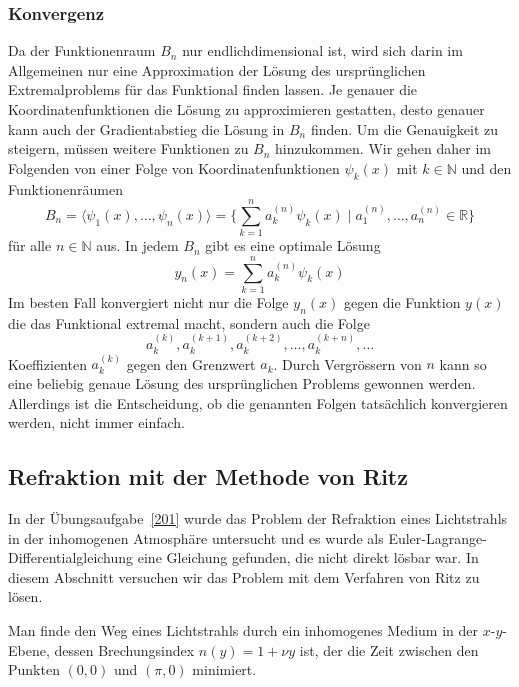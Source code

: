 %
%
\subsubsection{Konvergenz}
Da der Funktionenraum $B_n$ nur endlichdimensional ist, wird sich darin
im Allgemeinen nur eine Approximation der Lösung des ursprünglichen
Extremalproblems für das Funktional finden lassen.
Je genauer die Koordinatenfunktionen die Lösung zu approximieren gestatten,
desto genauer kann auch der Gradientabstieg die Lösung in $B_n$ finden.
Um die Genauigkeit zu steigern, müssen weitere Funktionen zu $B_n$ hinzukommen.
Wir gehen daher im Folgenden von einer Folge von Koordinatenfunktionen
$\psi_k(x)$ mit $k\in \mathbb{N}$ und den Funktionenräumen
\[
B_n
=
\langle \psi_1(x),\dots,\psi_n(x)\rangle
=
\biggl\{
\sum_{k=1}^n a_k^{(n)} \psi_k(x)
\;
\bigg|
\;
a_1^{(n)},\dots,a_n^{(n)}\in\mathbb{R}
\biggr\}
\]
für alle $n\in\mathbb{N}$ aus.
In jedem $B_n$ gibt es eine optimale Lösung
\[
y_n(x)
=
\sum_{k=1}^n a_k^{(n)} \psi_k(x)
\]
Im besten Fall konvergiert nicht nur die Folge $y_n(x)$ gegen die
Funktion $y(x)$ die das Funktional extremal macht, sondern auch
die Folge
\[
a_k^{(k)},
a_k^{(k+1)},
a_k^{(k+2)},
\dots,
a_k^{(k+n)},
\dots
\]
Koeffizienten $a_k^{(k)}$ gegen den Grenzwert $a_k$.
Durch Vergrössern von $n$ kann so eine beliebig genaue Lösung des
ursprünglichen Problems gewonnen werden.
Allerdings ist die Entscheidung, ob die genannten Folgen tatsächlich
konvergieren werden, nicht immer einfach.

%
%
\subsection{Refraktion mit der Methode von Ritz
\label{buch:direkt:ritz:subsection:refraktion}}
In der Übungsaufgabe~\ref{201} wurde das Problem der Refraktion eines
Lichtstrahls in der inhomogenen Atmosphäre untersucht und es wurde als
Euler-Lagrange-Differentialgleichung eine Gleichung gefunden, die nicht
direkt lösbar war.
In diesem Abschnitt versuchen wir das Problem mit dem Verfahren von Ritz
zu lösen.

\begin{aufgabe}
\label{buch:direkt:ritz:aufgabe:lichtstrahl}
Man finde den Weg eines Lichtstrahls durch ein inhomogenes Medium
in der $x$-$y$-Ebene,
dessen Brechungsindex $n(y)=1+\nu y$ ist, der die Zeit zwischen
den Punkten $(0,0)$ und $(\pi,0)$ minimiert.
\end{aufgabe}

